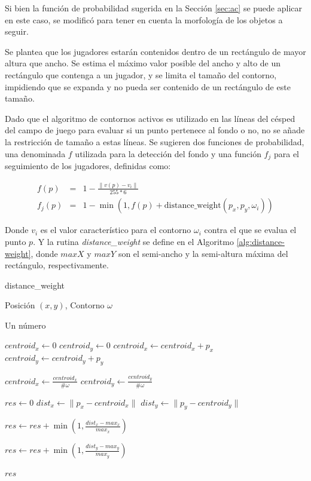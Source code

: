 Si bien la función de probabilidad sugerida en la Sección \ref{sec:ac} se puede
aplicar en este caso, se modificó para tener en cuenta la morfología de los
objetos a seguir.

Se plantea que los jugadores estarán contenidos dentro de un rectángulo de
mayor altura que ancho. Se estima el máximo valor posible del ancho y alto de
un rectángulo que contenga a un jugador, y se limita el tamaño del contorno,
impidiendo que se expanda y no pueda ser contenido de un rectángulo de este
tamaño.

Dado que el algoritmo de contornos activos es utilizado en las líneas
del césped del campo de juego para evaluar si un punto pertenece al fondo o no,
no se añade la restricción de tamaño a estas líneas. Se sugieren dos funciones
de probabilidad, una denominada $f$ utilizada para la detección del fondo y una
función $f_j$ para el seguimiento de los jugadores, definidas como:

\begin{eqnarray*}
    f(p) &=& 1 - \frac{\| v(p) - v_i \|}{255 * 6} \\
    f_j(p) &=& 1 - \min(1, f(p) + \text{distance\_weight}(p_x, p_y, \omega_i))
\end{eqnarray*}

Donde $v_i$ es el valor característico para el contorno $\omega_i$ contra el
que se evalua el punto $p$. Y la rutina \textit{distance\_weight} se define en
el Algoritmo \ref{alg:distance-weight}, donde $maxX$ y $maxY$ son el semi-ancho
y la semi-altura máxima del rectángulo, respectivamente.

\begin{algorithm}
    \caption{distance\_weight}
    \label{alg:distance-weight}
    \begin{algorithmic}
    \Require\hspace{\algorithmicindent}\hspace{\algorithmicindent}Posición $(x, y)$, Contorno $\omega$

    \Ensure\hspace{\algorithmicindent}\hspace{0.23cm} Un número
    \State

    \State $centroid_x \gets 0$
    \State $centroid_y \gets 0$
        \State $centroid_x \gets centroid_x + p_x$
        \State $centroid_y \gets centroid_y + p_y$
    \EndFor

    \State $centroid_x \gets \frac{centroid_x}{\#\omega}$
    \State $centroid_y \gets \frac{centroid_y}{\#\omega}$


    \State $res \gets 0$
    \State $dist_x \gets \|p_x - centroid_x\|$
    \State $dist_y \gets \|p_y - centroid_y\|$

        \State $res \gets res + \min(1, \frac{dist_x - max_x}{max_x})$
    \EndIf

        \State $res \gets res + \min(1, \frac{dist_y - max_y}{max_y})$
    \EndIf

    \State \Return $res$
    \end{algorithmic}
\end{algorithm}

